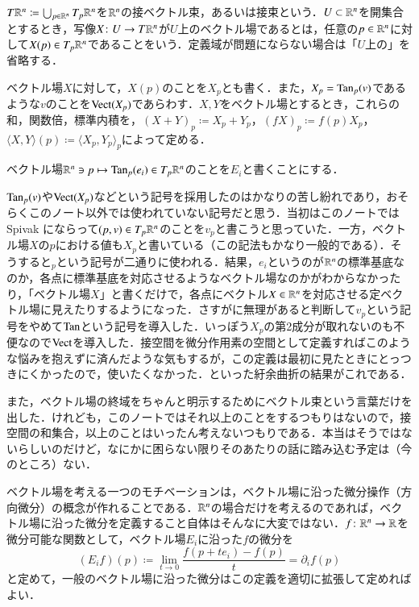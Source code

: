 \begin{defi}
$T\mathbb{R}^n \coloneqq \bigcup_{p \in \mathbb{R}^n} T_p \mathbb{R}^n$を$\mathbb{R}^n$の接ベクトル束，あるいは接束という．$U \subset \mathbb{R}^n$を開集合とするとき，写像$X \colon U \to T \mathbb{R}^n$が$U$上のベクトル場であるとは，任意の$p \in \mathbb{R}^n$に対して$X(p) \in T_p \mathbb{R}^n$であることをいう．定義域が問題にならない場合は「$U$上の」を省略する．

ベクトル場$X$に対して，$X(p)$のことを$X_p$とも書く．また，$X_p = \operatorname{Tan}_p(v)$であるような$v$のことを$\operatorname{Vect}(X_p)$であらわす．$X,Y$をベクトル場とするとき，これらの和，関数倍，標準内積を，$(X+Y)_p \coloneqq X_p + Y_p$，$(fX)_p \coloneqq f(p) X_p$，$\langle X, Y \rangle (p) \coloneqq \langle X_p, Y_p \rangle_p$によって定める．
\end{defi}

\begin{defi}
ベクトル場$\mathbb{R}^n \ni p \mapsto \operatorname{Tan}_p(e_i) \in T_p \mathbb{R}^n$のことを$E_i$と書くことにする．
\end{defi}

\begin{dig}
$\operatorname{Tan}_p(v)$や$\operatorname{Vect}(X_p)$などという記号を採用したのはかなりの苦し紛れであり，おそらくこのノート以外では使われていない記号だと思う．当初はこのノートでは Spivak にならって$(p,v) \in T_p \mathbb{R}^n$のことを$v_p$と書こうと思っていた．一方，ベクトル場$X$の$p$における値も$X_p$と書いている（この記法もかなり一般的である）．そうすると$_p$という記号が二通りに使われる．結果，$e_i$というのが$\mathbb{R}^n$の標準基底なのか，各点に標準基底を対応させるようなベクトル場なのかがわからなかったり，「ベクトル場$X$」と書くだけで，各点にベクトル$X \in \mathbb{R}^n$を対応させる定ベクトル場に見えたりするようになった．さすがに無理があると判断して$v_p$という記号をやめて$\operatorname{Tan}$という記号を導入した．いっぽう$X_p$の第2成分が取れないのも不便なので$\operatorname{Vect}$を導入した．接空間を微分作用素の空間として定義すればこのような悩みを抱えずに済んだような気もするが，この定義は最初に見たときにとっつきにくかったので，使いたくなかった．といった紆余曲折の結果がこれである．

また，ベクトル場の終域をちゃんと明示するためにベクトル束という言葉だけを出した．けれども，このノートではそれ以上のことをするつもりはないので，接空間の和集合，以上のことはいったん考えないつもりである．本当はそうではないらしいのだけど，なにかに困らない限りそのあたりの話に踏み込む予定は（今のところ）ない．
\end{dig}

ベクトル場を考える一つのモチベーションは，ベクトル場に沿った微分操作（方向微分）の概念が作れることである．$\mathbb{R}^n$の場合だけを考えるのであれば，ベクトル場に沿った微分を定義すること自体はそんなに大変ではない．$f \colon \mathbb{R}^n \to \mathbb{R}$を微分可能な関数として，ベクトル場$E_i$に沿った$f$の微分を
\begin{equation}
(E_i f)(p) \coloneqq \lim_{t \to 0} \frac{f(p + t e_i) - f(p)}{t} = \partial_i f (p)
\end{equation}と定めて，一般のベクトル場に沿った微分はこの定義を適切に拡張して定めればよい．

